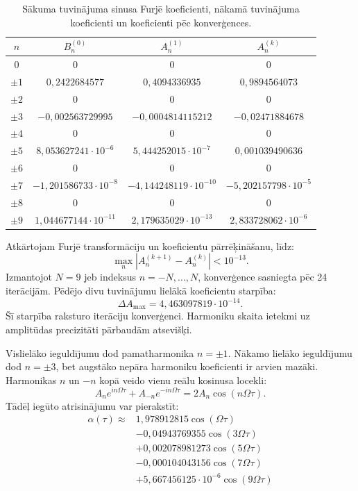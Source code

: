 \begin{table}[H]
    \centering
    \small
    \begin{tabular}{c|c|c|c}
        $n$ & $B_n^{(0)}$ & $A_n^{(1)}$ & $A_n^{(k)}$ \\
        \hline
$0$ & $0$ & $0$ & $0$ \\
$\pm 1$ & $0{,}2422684577$ & $0{,}4094336935$ & $0{,}9894564073$ \\
$\pm 2$ & $0$ & $0$ & $0$ \\
$\pm 3$ & $-0{,}002563729995$ & $-0{,}0004814115212$ & $-0{,}02471884678$ \\
$\pm 4$ & $0$ & $0$ & $0$ \\
$\pm 5$ & $8{,}053627241\cdot 10^{-6}$ & $5{,}444252015\cdot 10^{-7}$ & $0{,}001039490636$ \\
$\pm 6$ & $0$ & $0$ & $0$ \\
$\pm 7$ & $-1{,}201586733\cdot 10^{-8}$ & $-4{,}144248119\cdot 10^{-10}$ & $-5{,}202157798\cdot 10^{-5}$ \\
$\pm 8$ & $0$ & $0$ & $0$ \\
$\pm 9$ & $1{,}044677144\cdot 10^{-11}$ & $2{,}179635029\cdot 10^{-13}$ & $2{,}833728062\cdot 10^{-6}$ \\
    \end{tabular}
    \caption{Sākuma tuvinājuma sinusa Furjē koeficienti,
    nākamā tuvinājuma koeficienti un koeficienti pēc konverģences.}
\end{table}

Atkārtojam Furjē transformāciju un koeficientu
pārrēķināšanu, līdz:
\[
\max_n\left|A_n^{(k+1)}-A_n^{(k)}\right|<10^{-13}.
\]
Izmantojot $N=9$ jeb indeksus $n=-N,\ldots,N$,
konverģence sasniegta pēc 24 iterācijām.
Pēdējo divu tuvinājumu lielākā koeficientu starpība:
\[
\Delta A_{\max}=4{,}463097819\cdot 10^{-14}.
\]
Šī starpība raksturo iterāciju konverģenci.
Harmoniku skaita ietekmi uz amplitūdas precizitāti
pārbaudām atsevišķi.

Vislielāko ieguldījumu dod pamat­harmonika
$n=\pm1$. Nākamo lielāko ieguldījumu dod
$n=\pm3$, bet augstāko nepāra harmoniku
koeficienti ir arvien mazāki.
Harmonikas $n$ un $-n$ kopā veido vienu
reālu kosinusa locekli:
\[
A_ne^{in\Omega\tau}+A_{-n}e^{-in\Omega\tau}
=2A_n\cos(n\Omega\tau).
\]
Tādēļ iegūto atrisinājumu var pierakstīt:
\[
\begin{aligned}
\alpha(\tau)\approx {} &1{,}978912815\cos(\Omega\tau) \\
&- 0{,}04943769355\cos(3\Omega\tau) \\
&+ 0{,}002078981273\cos(5\Omega\tau) \\
&- 0{,}000104043156\cos(7\Omega\tau) \\
&+ 5{,}667456125\cdot 10^{-6}\cos(9\Omega\tau)
\end{aligned}
\]

